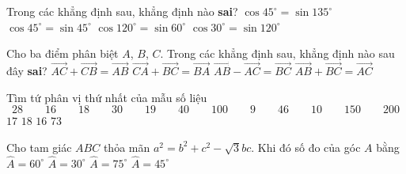 \begin{ex}%
   Trong các khẳng định sau, khẳng định nào \textbf{sai}?
   \choice
   {$\cos 45^\circ = \sin 135^\circ$}
   {$\cos 45^\circ = \sin 45^\circ$}
   {\True $\cos 120^\circ = \sin 60^\circ$}
   {$\cos 30^\circ = \sin 120^\circ$}
\end{ex}

\begin{ex}%
   Cho ba điểm phân biệt $A$, $B$, $C$. Trong các khẳng định sau, khẳng định nào sau đây \textbf{sai}?
   \choice
   {$\overrightarrow{AC} + \overrightarrow{CB} = \overrightarrow{AB}$}
   {$\overrightarrow{CA} + \overrightarrow{BC} = \overrightarrow{BA}$}
   {\True $\overrightarrow{AB} - \overrightarrow{AC} = \overrightarrow{BC}$}
   {$\overrightarrow{AB} + \overrightarrow{BC} = \overrightarrow{AC}$}
\end{ex}

\begin{ex}%
   Tìm tứ phân vị thứ nhất của mẫu số liệu
   \[28\qquad 16\qquad 18 \qquad30 \qquad 19 \qquad 40 \qquad 100 \qquad 9 \qquad46 \qquad 10 \qquad 150 \qquad 200\]
   \choice
   {\True $17$}
   {$18$}
   {$16$}
   {$73$}
\end{ex}

\begin{ex}%
   Cho tam giác $ABC$ thỏa mãn $a^2 = b^2 + c^2 -\sqrt{3}bc$. Khi đó số đo của góc $A$ bằng
   \choice
   {$\widehat{A} = 60^\circ$}
   {\True $\widehat{A} = 30^\circ$}
   {$\widehat{A} = 75^\circ$}
   {$\widehat{A} = 45^\circ$}
\end{ex}

